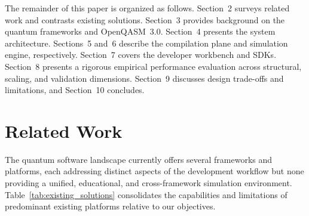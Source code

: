 \documentclass[runningheads]{llncs}
\begin{document}
The remainder of this paper is organized as follows. Section~2 surveys related work and contrasts existing solutions. Section~3 provides background on the quantum frameworks and OpenQASM~3.0. Section~4 presents the system architecture. Sections~5 and~6 describe the compilation plane and simulation engine, respectively. Section~7 covers the developer workbench and SDKs. Section~8 presents a rigorous empirical performance evaluation across structural, scaling, and validation dimensions. Section~9 discusses design trade-offs and limitations, and Section~10 concludes.


\section{Related Work}

The quantum software landscape currently offers several frameworks and platforms, each addressing distinct aspects of the development workflow but none providing a unified, educational, and cross-framework simulation environment. Table~\ref{tab:existing_solutions} consolidates the capabilities and limitations of predominant existing platforms relative to our objectives.
\end{document}
